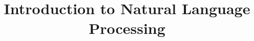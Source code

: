 \documentclass[xcolor=dvipsnames,compress,t,pdf,9pt]{beamer}
\title[\insertframenumber /\inserttotalframenumber]{Introduction to Natural Language Processing}
\begin{document}
	\begin{frame}
	\titlepage
	\end{frame}
	
%	
	
	
\end{document}

